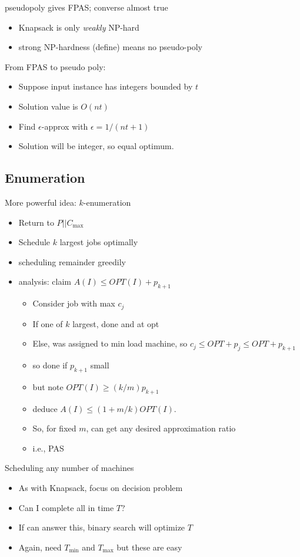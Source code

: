 \documentclass{article}
\begin{document}
pseudopoly gives FPAS; converse almost true
\begin{itemize}
\item Knapsack is only \emph{weakly} NP-hard
\item strong NP-hardness (define) means no pseudo-poly
\end{itemize}

From FPAS to pseudo poly:
\begin{itemize}
\item Suppose input instance has integers bounded by $t$
\item Solution value is $O(nt)$
\item Find $\epsilon$-approx with $\epsilon=1/(nt+1)$
\item Solution will be integer, so equal optimum.
\end{itemize}


\subsection*{Enumeration}



More powerful idea: $k$-enumeration
\begin{itemize}
\item Return to $P || C_{\max}$
\item Schedule $k$ largest jobs optimally
\item scheduling remainder greedily
\item analysis: claim $A(I) \le OPT(I)+p_{k+1}$
\begin{itemize}
\item Consider job with max $c_j$
\item If one of $k$ largest, done and at opt
\item Else, was assigned to min load machine, so $c_j \le OPT+p_j \le
  OPT+p_{k+1}$ 
\item so done if $p_{k+1}$ small
\item but note $OPT(I) \ge (k/m)p_{k+1}$
\item deduce $A(I) \le  (1+m/k)OPT(I)$.
\item So, for fixed $m$, can get any desired approximation ratio
\item i.e., PAS
\end{itemize}
\end{itemize}


Scheduling any number of machines
\begin{itemize}
\item As with Knapsack, focus on decision problem
\item Can I complete all in time $T$?
\item If can answer this, binary search will optimize $T$
\item Again, need $T_{\min}$ and $T_{\max}$ but these are easy
\end{itemize}
\end{document}
